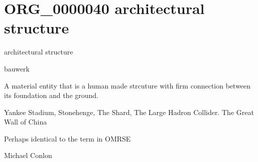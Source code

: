 \documentclass[letterpaper,10pt,english]{sphinxmanual}
\begin{document}
\section{ORG\_0000040 \sphinxhyphen{} architectural structure}
\label{\detokenize{doc-ORG_0000040:org-0000040-architectural-structure}}\label{\detokenize{doc-ORG_0000040:index-0}}\label{\detokenize{doc-ORG_0000040::doc}}
\begin{sphinxShadowBox}

\sphinxAtStartPar
architectural structure
\end{sphinxShadowBox}

\begin{sphinxShadowBox}

\sphinxAtStartPar
bauwerk
\end{sphinxShadowBox}

\begin{sphinxShadowBox}

\sphinxAtStartPar
A material entity that is a human made strcuture with firm connection between its foundation and the ground.
\end{sphinxShadowBox}

\begin{sphinxShadowBox}

\sphinxAtStartPar
{}
\end{sphinxShadowBox}

\begin{sphinxShadowBox}

\sphinxAtStartPar
Yankee Stadium, Stonehenge, The Shard, The Large Hadron Collider. The Great Wall of China
\end{sphinxShadowBox}

\begin{sphinxShadowBox}

\sphinxAtStartPar
Perhaps identical to the term in OMRSE
\end{sphinxShadowBox}

\begin{sphinxShadowBox}

\sphinxAtStartPar
Michael Conlon 
\end{sphinxShadowBox}
\end{document}
